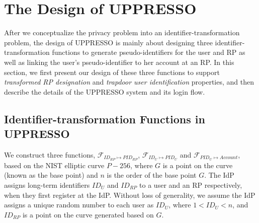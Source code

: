 \section{The Design of UPPRESSO}
\label{sec:UPPRESSO}

After we conceptualize the privacy problem into an identifier-transformation problem, the design of UPPRESSO is mainly about designing three identifier-transformation functions to generate pseudo-identifiers for the user and RP as well as linking the user's pseudo-identifier to her account at an RP. In this section, we first present our design of these three functions to support {\em transformed RP designation} and {\em trapdoor user identification} properties, and then describe the details of the UPPRESSO system and its login flow.


\subsection{Identifier-transformation Functions in UPPRESSO}
\label{subsec:overview}


We construct three functions, $\mathcal{F}_{ID_{RP} \mapsto PID_{RP}}$, $\mathcal{F}_{ID_{U} \mapsto PID_{U}}$ and $\mathcal{F}_{PID_{U} \mapsto Account}$, based on the NIST elliptic curve $P-256$,
where
$G$ is a point on the curve (known as the base point)
and $n$ is the order of the base point $G$. %
The IdP assigns long-term identifiers $ID_U$ and $ID_{RP}$ to a user and an RP respectively, when they first register at the IdP. Without loss of generality, we assume the IdP assigns a unique random number to each user as $ID_U$, where $1<ID_U<n$, and $ID_{RP}$ is a point on the curve generated based on $G$.%

